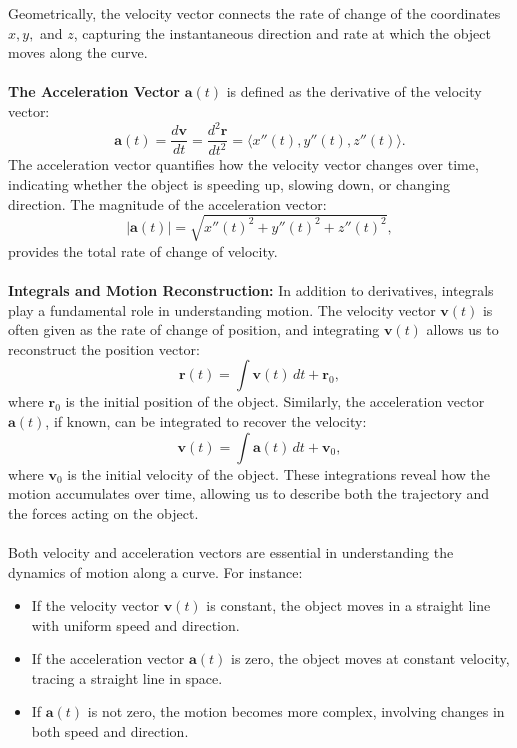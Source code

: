 \noindent Geometrically, the velocity vector connects the rate of change of the coordinates \( x, y, \) and \( z \), capturing the instantaneous direction and rate at which the object moves along the curve. \\ \\ \textbf{The Acceleration Vector} \( \mathbf{a}(t) \) is defined as the derivative of the velocity vector:
\[
\mathbf{a}(t) = \frac{d\mathbf{v}}{dt} = \frac{d^2\mathbf{r}}{dt^2} = \langle x''(t), y''(t), z''(t) \rangle.
\]
The acceleration vector quantifies how the velocity vector changes over time, indicating whether the object is speeding up, slowing down, or changing direction. The magnitude of the acceleration vector:
\[
|\mathbf{a}(t)| = \sqrt{x''(t)^2 + y''(t)^2 + z''(t)^2},
\]
provides the total rate of change of velocity. \\ \\ \textbf{Integrals and Motion Reconstruction:} In addition to derivatives, integrals play a fundamental role in understanding motion. The velocity vector \( \mathbf{v}(t) \) is often given as the rate of change of position, and integrating \( \mathbf{v}(t) \) allows us to reconstruct the position vector:
\[
\mathbf{r}(t) = \int \mathbf{v}(t) \, dt + \mathbf{r}_0,
\]
where \( \mathbf{r}_0 \) is the initial position of the object. Similarly, the acceleration vector \( \mathbf{a}(t) \), if known, can be integrated to recover the velocity:
\[
\mathbf{v}(t) = \int \mathbf{a}(t) \, dt + \mathbf{v}_0,
\]
where \( \mathbf{v}_0 \) is the initial velocity of the object. These integrations reveal how the motion accumulates over time, allowing us to describe both the trajectory and the forces acting on the object. \\ \\ Both velocity and acceleration vectors are essential in understanding the dynamics of motion along a curve. For instance:
\begin{itemize}
    \item If the velocity vector \( \mathbf{v}(t) \) is constant, the object moves in a straight line with uniform speed and direction.
    \item If the acceleration vector \( \mathbf{a}(t) \) is zero, the object moves at constant velocity, tracing a straight line in space.
    \item If \( \mathbf{a}(t) \) is not zero, the motion becomes more complex, involving changes in both speed and direction.
\end{itemize}


